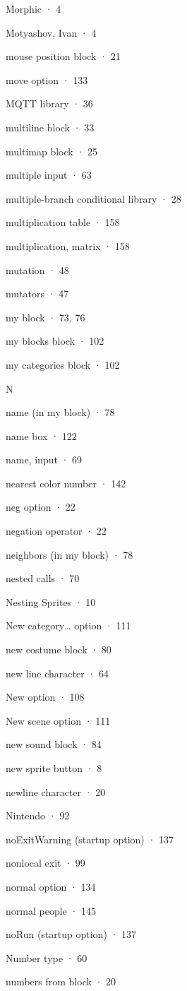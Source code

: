 Morphic · 4

Motyashov, Ivan · 4

mouse position block · 21

move option · 133

MQTT library · 36

multiline block · 33

multimap block · 25

multiple input · 63

multiple-branch conditional library · 28

multiplication table · 158

multiplication, matrix · 158

mutation · 48

mutators · 47

my block · 73, 76

my blocks block · 102

my categories block · 102

N

name (in my block) · 78

name box · 122

name, input · 69

nearest color number · 142

neg option · 22

negation operator · 22

neighbors (in my block) · 78

nested calls · 70

Nesting Sprites · 10

New category\ldots{} option · 111

new costume block · 80

new line character · 64

New option · 108

New scene option · 111

new sound block · 84

new sprite button · 8

newline character · 20

Nintendo · 92

noExitWarning (startup option) · 137

nonlocal exit · 99

normal option · 134

normal people · 145

noRun (startup option) · 137

Number type · 60

numbers from block · 20

